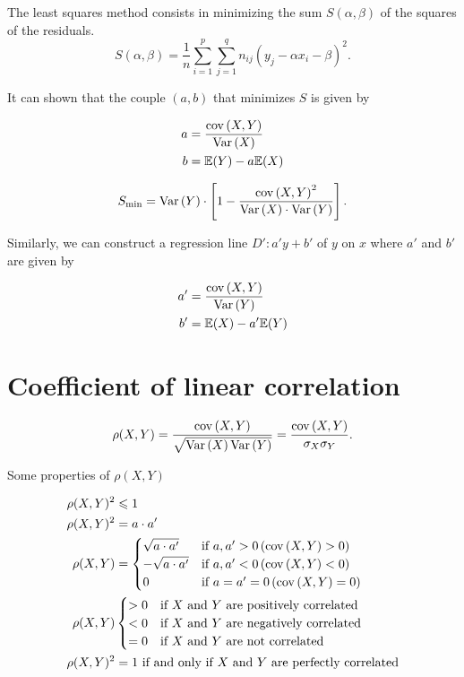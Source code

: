 \documentclass{report}
\begin{document}
The least squares method consists in minimizing the sum $S(\alpha,\beta)$ of the squares of the residuals.\\

\[
	S(\alpha,\beta) = \frac{1}{n} \sum_{i=1}^p \sum_{j=1}^q n_{ij}(y_j - \alpha x_i - \beta)^2
	.\]

It can shown that the couple $(a,b)$ that minimizes $S$ is given by

\begin{align*}
	a & = \frac{\mathrm{cov}\left( X,Y \right)}{\mathrm{Var}\left( X \right)} \\
	b & = \mathbb{E}(Y) - a\mathbb{E}(X)
\end{align*}

\[
	S_{\min} = \mathrm{Var}\left( Y \right)\cdot\left[ 1 - \frac{\mathrm{cov}\left( X,Y \right)^2}{\mathrm{Var}\left( X \right)\cdot\mathrm{Var}\left( Y \right)} \right]
	.\]

Similarly, we can construct a regression line $D': a'y + b'$ of $y$ on $x$ where $a'$ and $b'$ are given by

\begin{align*}
	a' & = \frac{\mathrm{cov}\left( X,Y \right)}{\mathrm{Var}\left( Y \right)} \\
	b' & = \mathbb{E}(X) - a'\mathbb{E}(Y)
\end{align*}

\section{Coefficient of linear correlation}

\[
	\rho(X,Y) = \frac{\mathrm{cov}\left( X,Y \right)}{\sqrt{\mathrm{Var}\left( X \right)\mathrm{Var}\left( Y \right)}} = \frac{\mathrm{cov}\left( X,Y \right)}{\sigma_X\sigma_Y}
	.\]

Some properties of $\rho(X,Y)$

\begin{align*}
	\rho(X,Y)^2 & \leqslant 1                                                                        \\
	\rho(X,Y)^2 & = a\cdot a'                                                                   \\
	\rho(X,Y)   & = \begin{cases}
		                \sqrt{a\cdot a'}  & \text{if } a, a' > 0 \,(\mathrm{cov}\left( X,Y \right) > 0)  \\
		                -\sqrt{a\cdot a'} & \text{if } a, a' < 0 \,(\mathrm{cov}\left( X,Y \right) < 0)  \\
		                0                 & \text{if } a = a' = 0 \,(\mathrm{cov}\left( X,Y \right) = 0)
	                \end{cases}                 \\
	\rho(X,Y)   & \begin{cases}
		              > 0 & \text{if } X \text{ and } Y \text{ are positively correlated} \\
		              < 0 & \text{if } X \text{ and } Y \text{ are negatively correlated} \\
		              = 0 & \text{if } X \text{ and } Y \text{ are not correlated}
	              \end{cases}           \\
	\rho(X,Y)^2 & = 1 \text{ if and only if } X \text{ and } Y \text{ are perfectly correlated}
\end{align*}
\end{document}
